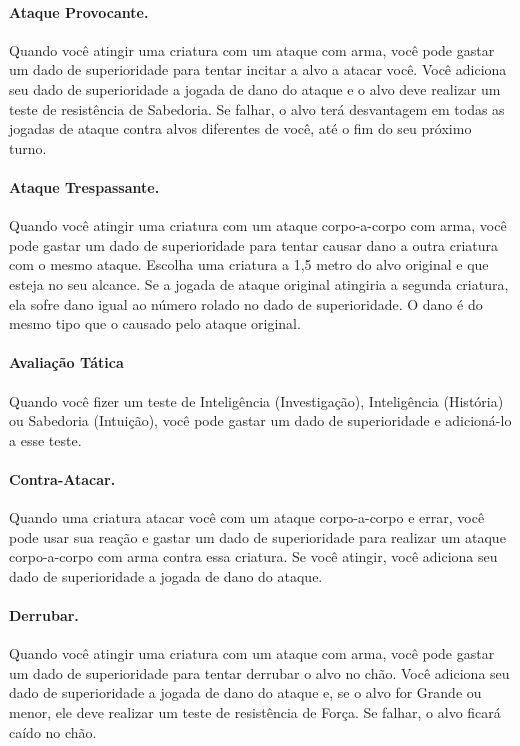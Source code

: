 \documentclass{RPG_Adventure}[2021/10/20]
\begin{document}
\begin{multicols}{2}
\paragraph{Ataque Provocante.} Quando você atingir uma criatura com um ataque
com arma, você pode gastar um dado de superioridade para tentar incitar a alvo a
atacar você. Você adiciona seu dado de superioridade a jogada de dano do ataque
e o alvo deve realizar um teste de resistência de Sabedoria. Se falhar, o alvo
terá desvantagem em todas as jogadas de ataque contra alvos diferentes de você,
até o fim do seu próximo turno.

\paragraph{Ataque Trespassante.} Quando você atingir uma criatura com um ataque
corpo-a-corpo com arma, você pode gastar um dado de superioridade para tentar
causar dano a outra criatura com o mesmo ataque. Escolha uma criatura a 1,5
metro do alvo original e que esteja no seu alcance. Se a jogada de ataque
original atingiria a segunda criatura, ela sofre dano igual ao número rolado no
dado de superioridade. O dano é do mesmo tipo que o causado pelo ataque
original.

\paragraph{Avaliação Tática} Quando você fizer um teste de Inteligência
(Investigação), Inteligência (História) ou Sabedoria (Intuição), você pode
gastar um dado de superioridade e adicioná-lo a esse teste.

\paragraph{Contra-Atacar.} Quando uma criatura atacar você com um ataque
corpo-a-corpo e errar, você pode usar sua reação e gastar um dado de
superioridade para realizar um ataque corpo-a-corpo com arma contra essa
criatura.  Se você atingir, você adiciona seu dado de superioridade a jogada de
dano do ataque.

\paragraph{Derrubar.} Quando você atingir uma criatura com um ataque com arma,
você pode gastar um dado de superioridade para tentar derrubar o alvo no chão.
Você adiciona seu dado de superioridade a jogada de dano do ataque e, se o alvo
for Grande ou menor, ele deve realizar um teste de resistência de Força. Se
falhar, o alvo ficará caído no chão.


\end{multicols}
\end{document}

